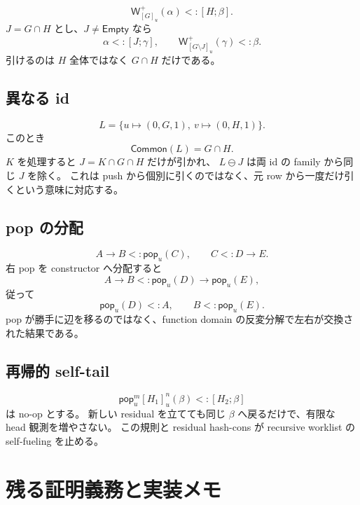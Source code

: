 \documentclass[uplatex,dvipdfmx,a4paper,10.5pt]{jsarticle}
\theoremstyle{jpplain}
\newcommand{\Empty}{\mathsf{Empty}}
\newcommand{\Common}{\mathsf{Common}}
\newcommand{\PWeight}[2]{\mathsf{W}^{+}_{#1}(#2)}
\newcommand{\takeop}[2]{[#1]_{#2}}
\newcommand{\popop}[1]{\mathsf{pop}_{#1}}
\newcommand{\row}[2]{[#1;#2]}
\begin{document}
\[
  \PWeight{\takeop{G}{u}}{\alpha}<:\row{H}{\beta}.
\]
$J=G\cap H$ とし、$J\neq\Empty$ なら
\[
  \alpha<:\row{J}{\gamma},
  \qquad
  \PWeight{\takeop{G\setminus J}{u}}{\gamma}<:\beta.
\]
引けるのは $H$ 全体ではなく $G\cap H$ だけである。

\subsection{異なる id}

\[
  L=\{u\mapsto(0,G,1),\ v\mapsto(0,H,1)\}.
\]
このとき
\[
  \Common(L)=G\cap H.
\]
$K$ を処理すると $J=K\cap G\cap H$ だけが引かれ、
$L\ominus J$ は両 id の family から同じ $J$ を除く。
これは push から個別に引くのではなく、元 row から一度だけ引くという意味に対応する。

\subsection{pop の分配}

\[
  A\to B <: \popop{u}(C),
  \qquad C<:D\to E.
\]
右 pop を constructor へ分配すると
\[
  A\to B <: \popop{u}(D)\to\popop{u}(E),
\]
従って
\[
  \popop{u}(D)<:A,
  \qquad B<:\popop{u}(E).
\]
pop が勝手に辺を移るのではなく、function domain の反変分解で左右が交換された結果である。

\subsection{再帰的 self-tail}

\[
  \popop{u}^{m}\takeop{H_1}{u}^{n}(\beta)<:\row{H_2}{\beta}
\]
は no-op とする。
新しい residual を立てても同じ $\beta$ へ戻るだけで、有限な head 観測を増やさない。
この規則と residual hash-cons が recursive worklist の self-fueling を止める。

\section{残る証明義務と実装メモ}
\end{document}
